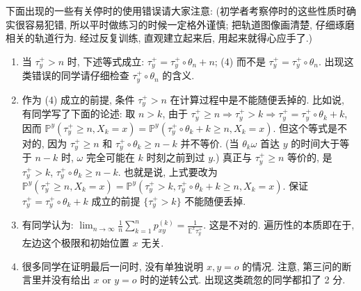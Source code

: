 \begin{enumerate}
\begin{proofc}[证明]
        下面出现的一些有关停时的使用错误请大家注意: (初学者考察停时的这些性质时确实很容易犯错, 所以平时做练习的时候一定格外谨慎; 把轨道图像画清楚, 仔细琢磨相关的轨道行为. 经过反复训练, 直观建立起来后, 用起来就得心应手了.) \begin{enumerate}[label=(\arabic*)] \item 当 $\tau_y^+>n$ 时, 下述等式成立: $\tau_y^+=\tau_y^+\circ\theta_n+n$; (4) 而不是 $\tau_y^+=\tau_y^+\circ\theta_n$. 出现这类错误的同学请仔细检查 $\tau_y^+\circ\theta_n$ 的含义. \item 作为 (4) 成立的前提, 条件 $\tau_y^+>n$ 在计算过程中是不能随便丢掉的. 比如说, 有同学写了下面的论述: 取 $n>k$, 由于 $\tau_y^+\geq n\Rightarrow \tau_y^+>k\Rightarrow \tau_y^+=\tau_y^+\circ\theta_k+k$, 因而 $\mathbb P^y(\tau_y^+\geq n,X_k=x)=\mathbb P^y(\tau_y^+\circ\theta_k+k\geq n,X_k=x)$. 但这个等式是不对的, 因为 $\tau_y^+\geq n$ 和 $\tau_y^+\circ\theta_k\geq n-k$ 并不等价. (当 $\theta_k\omega$ 首达 $y$ 的时间大于等于 $n-k$ 时, $\omega$ 完全可能在 $k$ 时刻之前到过 $y$.) 真正与 $\tau_y^+\geq n$ 等价的, 是 $\tau_y^+>k$, $\tau_y^+\circ\theta_k\geq n-k$. 也就是说, 上式要改为 $\mathbb P^y(\tau_y^+\geq n,X_k=x)=\mathbb P^y(\tau_y^+>k,\tau_y^+\circ\theta_k+k\geq n,X_k=x)$. 保证 $\tau_y^+=\tau_y^+\circ\theta_k+k$ 成立的前提 $\{\tau_y^+>k\}$ 不能随便丢掉. \item 有同学认为: $\lim_{n\to\infty}\frac1n\sum_{k=1}^n p_{xy}^{(k)}=\frac{1}{\mathbb E^x\tau_y^+}$. 这是不对的. 遍历性的本质即在于, 左边这个极限和初始位置 $x$ 无关. \item 很多同学在证明最后一问时, 没有单独说明 $x,y=o$ 的情况. 注意, 第三问的断言里并没有给出 $x$ or $y=o$ 时的逆转公式. 出现这类疏忽的同学都扣了 2 分. \end{enumerate}
    \end{proofc}


\end{enumerate}
